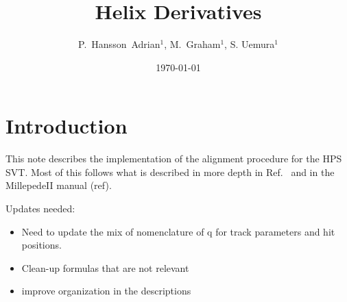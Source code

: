\documentclass{article}
\begin{document}
%
\title{Helix Derivatives}
\author{P.~Hansson~Adrian$^{1}$, M.~Graham$^{1}$, S. Uemura$^{1}$}
       



\date{\today}%


\maketitle



\section{Introduction}

This note describes the implementation of the alignment procedure for the HPS SVT. 
Most of this follows what is described in more depth in Ref.~\cite{cms_align} and in the MillepedeII manual (ref).

Updates needed:
\begin{itemize} 
\item Need to update the mix of nomenclature of q for track parameters and hit positions.
\item Clean-up formulas that are not relevant
\item improve organization in the descriptions
\end{itemize}
\end{document}
